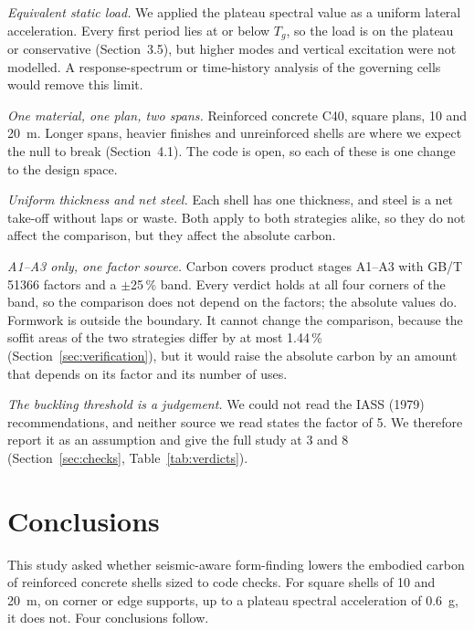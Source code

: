 \documentclass[preprint,12pt]{elsarticle}
\begin{document}
\textit{Equivalent static load.} We applied the plateau spectral value as a uniform lateral acceleration. Every first period lies at or below $T_g$, so the load is on the plateau or conservative (Section~3.5), but higher modes and vertical excitation were not modelled. A response-spectrum or time-history analysis of the governing cells would remove this limit.

\textit{One material, one plan, two spans.} Reinforced concrete C40, square plans, 10 and 20~m. Longer spans, heavier finishes and unreinforced shells are where we expect the null to break (Section~4.1). The code is open, so each of these is one change to the design space.

\textit{Uniform thickness and net steel.} Each shell has one thickness, and steel is a net take-off without laps or waste. Both apply to both strategies alike, so they do not affect the comparison, but they affect the absolute carbon.

\textit{A1--A3 only, one factor source.} Carbon covers product stages A1--A3 with GB/T 51366 factors and a $\pm$25\,\% band. Every verdict holds at all four corners of the band, so the comparison does not depend on the factors; the absolute values do. Formwork is outside the boundary. It cannot change the comparison, because the soffit areas of the two strategies differ by at most 1.44\,\% (Section~\ref{sec:verification}), but it would raise the absolute carbon by an amount that depends on its factor and its number of uses.

\textit{The buckling threshold is a judgement.} We could not read the IASS (1979) recommendations, and neither source we read states the factor of 5. We therefore report it as an assumption and give the full study at 3 and 8 (Section~\ref{sec:checks}, Table~\ref{tab:verdicts}).

\section{Conclusions}\label{sec:conclusions}

This study asked whether seismic-aware form-finding lowers the embodied carbon of reinforced concrete shells sized to code checks. For square shells of 10 and 20~m, on corner or edge supports, up to a plateau spectral acceleration of 0.6~g, it does not. Four conclusions follow.
\end{document}

